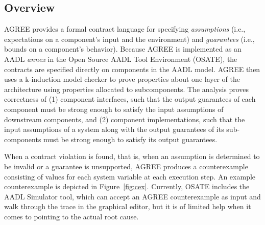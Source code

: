 \subsection{Overview}

AGREE provides a formal contract language for specifying \textit{assumptions} (i.e., expectations on a component's input and the environment) and \textit{guarantees} (i.e., bounds on a component's behavior).  Because AGREE is implemented as an AADL \textit{annex} in the Open Source AADL Tool Environment (OSATE), the contracts are specified directly on components in the AADL model.  AGREE then uses a k-induction model checker to prove properties about one layer of the architecture using properties allocated to subcomponents. The analysis proves correctness of (1) component interfaces, such that the output guarantees of each component must be strong enough to satisfy the input assumptions of downstream components, and (2) component implementations, such that the input assumptions of a system along with the output guarantees of its sub-components must be strong enough to satisfy its output guarantees.

When a contract violation is found, that is, when an assumption is determined to be invalid or a guarantee is unsupported, AGREE produces a counterexample consisting of values for each system variable at each execution step.  An example counterexample is depicted in Figure~\ref{fig:cex}.  Currently, OSATE includes the AADL Simulator tool, which can accept an AGREE counterexample as input and walk through the trace in the graphical editor, but it is of limited help when it comes to pointing to the actual root cause. 



